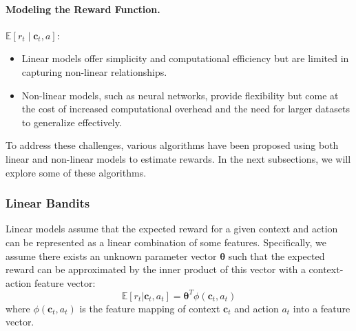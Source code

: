 \paragraph{Modeling the Reward Function.} 
$\mathbb{E}[r_t \mid \mathbf{c}_t, a]$:
\begin{itemize}
    \item Linear models offer simplicity and computational efficiency but are limited in capturing non-linear relationships.
    \item Non-linear models, such as neural networks, provide flexibility but come at the cost of increased computational overhead and the need for larger datasets to generalize effectively.
\end{itemize}


To address these challenges, various algorithms have been proposed using both linear and non-linear models to estimate rewards. In the next subsections, we will explore some of these algorithms.


\subsubsection{Linear Bandits}
Linear models assume that the expected reward for a given context and action can be represented as a linear combination of some features. Specifically, we assume there exists an unknown parameter vector $\boldsymbol{\theta}$ such that the expected reward can be approximated by the inner product of this vector with a context-action feature vector:
\begin{equation}
    \mathbb{E}[r_t | \mathbf{c}_t, a_t] = \boldsymbol{\theta}^T \phi(\mathbf{c}_t, a_t)
\end{equation}
where $\phi(\mathbf{c}_t, a_t)$ is the feature mapping of context $\mathbf{c}_t$ and action $a_t$ into a feature vector.

